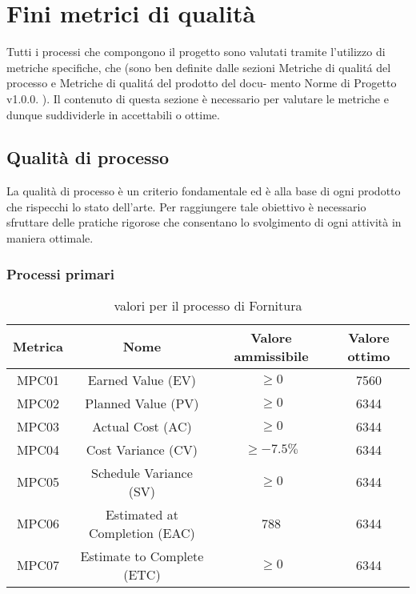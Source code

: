 \documentclass[italian,12pt]{article} %
\begin{document}
\section{Fini metrici di qualità}
Tutti i processi che compongono il progetto sono valutati tramite l'utilizzo 
di metriche specifiche, che (sono ben definite dalle sezioni Metriche di qualitá del processo e Metriche di qualitá del prodotto del docu-
mento Norme di Progetto v1.0.0. ).
Il contenuto di questa sezione è necessario per valutare le metriche e 
dunque suddividerle in accettabili o ottime.

\subsection{Qualità di processo}
La qualità di processo è un criterio fondamentale ed è alla base di ogni prodotto
che rispecchi lo stato dell'arte. Per raggiungere tale obiettivo è necessario 
sfruttare delle pratiche rigorose che consentano lo svolgimento di ogni attività
in maniera ottimale.

\subsubsection{Processi primari}


\begin{table}[h!]
	\centering
	\begin{tabular}{|c|c|c|c|} 
	 \hline
	 Metrica & Nome & Valore ammissibile & Valore ottimo \\  
	 \hline
	 MPC01 & Earned Value (EV) & $\geq 0$ & 7560 \\
	 \hline
	 MPC02 & Planned Value (PV) & $\geq 0$ & 6344 \\ 
	 \hline
	 MPC03 & Actual Cost (AC) & $\geq 0$ & 6344 \\ 
	 \hline
	 MPC04 & Cost Variance (CV) & $\geq -7.5\%$ & 6344 \\ 
	 \hline
	 MPC05 & Schedule Variance (SV) & $\geq 0$ & 6344 \\ 
	 \hline
	 MPC06 & Estimated at Completion (EAC) & 788 & 6344 \\ 
	 \hline
	 MPC07 & Estimate to Complete (ETC)  & $\geq 0$ & 6344 \\ 
	 \hline
	\end{tabular}
	\caption{ valori per il processo di Fornitura}
	\label{table:1}
	\end{table}
\end{document}

